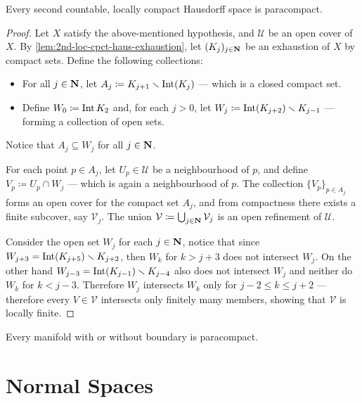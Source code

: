 \begin{theorem}
\label{thm:2nd-ctbl-loc-cpct-haus-is-paracompact}
Every second countable, locally compact Hausdorff space is paracompact.
\end{theorem}

\begin{proof}
Let \(X\) satisfy the above-mentioned hypothesis, and \(\mathcal{U}\) be an open
cover of \(X\). By \cref{lem:2nd-loc-cpct-haus-exhaustion}, let
\((K_j)_{j \in \mathbf{N}}\) be an exhaustion of \(X\) by compact sets. Define the
following collections:
\begin{itemize}\setlength\itemsep{0em}
\item For all \(j \in \mathbf{N}\), let \(A_j \coloneq K_{j+1} \smallsetminus \operatorname{Int}(K_j)\) ---
  which is a closed compact set.
\item Define \(W_0 \coloneq \operatorname{Int} K_2\) and, for each \(j > 0\), let
  \(W_j \coloneq \operatorname{Int}(K_{j+2}) \smallsetminus K_{j-1}\) --- forming a collection of
  open sets.
\end{itemize}
Notice that \(A_j \subseteq W_j\) for all \(j \in \mathbf{N}\).

For each point \(p \in A_j\), let \(U_p \in \mathcal{U}\) be a neighbourhood of
\(p\), and define \(V_p \coloneq U_p \cap W_j\) --- which is again a
neighbourhood of \(p\). The collection \(\{V_p\}_{p \in A_j}\) forms an open
cover for the compact set \(A_j\), and from compactness there exists a finite
subcover, say \(\mathcal{V}_j\). The union
\(\mathcal{V} \coloneq \bigcup_{j \in \mathbf{N}} \mathcal{V}_j\) is an open refinement
of \(\mathcal{U}\).


Consider the open set \(W_j\) for each \(j \in \mathbf{N}\), notice that since \(W_{j+3}
= \operatorname{Int}(K_{j+5}) \smallsetminus K_{j+2}\), then \(W_k\) for \(k > j+3\) does not
intersect \(W_j\). On the other hand \(W_{j-3} = \operatorname{Int}(K_{j - 1}) \smallsetminus
K_{j-4}\) also does not intersect \(W_j\) and neither do \(W_k\) for \(k < j -
3\). Therefore \(W_j\) intersects \(W_k\) only for \(j - 2 \leq k \leq j + 2\)
--- therefore every \(V \in \mathcal{V}\) intersects only finitely many members,
showing that \(\mathcal{V}\) is locally finite.
\end{proof}

\begin{corollary}
\label{cor:manifold-paracompact}
Every manifold with or without boundary is paracompact.
\end{corollary}

\section{Normal Spaces}

